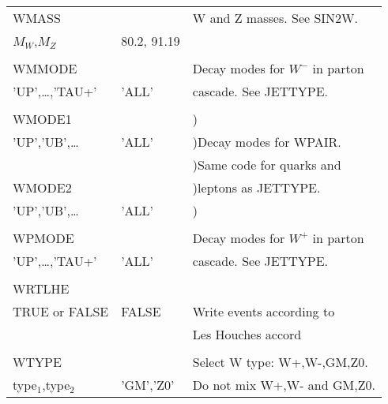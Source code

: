 \newpage
\begin{center}
\begin{tabular}{lll}
\hline\hline
WMASS                  &                   & W and Z masses. See SIN2W.     \\
$M_W$,$M_Z$            & 80.2, 91.19       &                                \\
                       &                   &                                \\
WMMODE                 &                   & Decay modes for $W^-$ in parton\\
'UP',\dots,'TAU+'      & 'ALL'             & cascade. See JETTYPE.          \\
                       &                   &                                \\
WMODE1                 &                   & )                              \\
'UP','UB',\dots        & 'ALL'             & )Decay modes for WPAIR.        \\
                       &                   & )Same code for quarks and      \\
WMODE2                 &                   & )leptons as JETTYPE.           \\
'UP','UB',\dots        & 'ALL'             & )                              \\
                       &                   &                                \\
WPMODE                 &                   & Decay modes for $W^+$ in parton\\
'UP',\dots,'TAU+'      & 'ALL'             & cascade. See JETTYPE.          \\
                       &                   &                                \\
WRTLHE                 &                   &                                \\
TRUE or FALSE          & FALSE             & Write events according to      \\
                       &                   & Les Houches accord             \\
                       &                   &                                \\
WTYPE                  &                   & Select W type: W+,W-,GM,Z0.    \\
type$_1$,type$_2$      & 'GM','Z0'         & Do not mix W+,W- and GM,Z0.    \\

\end{tabular}
\end{center}
